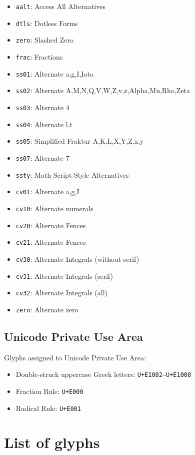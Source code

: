 \documentclass[a4paper]{scrartcl}
\newcommand*{\opt}[1]{\texttt{#1}}
\begin{document}
\begin{itemize}
  \item \opt{aalt}: Access All Alternatives
  \item \opt{dtls}: Dotless Forms
  \item \opt{zero}: Slashed Zero
  \item \opt{frac}: Fractions
  \item \opt{ss01}: Alternate a,g,I,Iota
  \item \opt{ss02}: Alternate A,M,N,Q,V,W,Z,v,z,Alpha,Mu,Rho,Zeta
  \item \opt{ss03}: Alternate 4
  \item \opt{ss04}: Alternate l,t
  \item \opt{ss05}: Simplified Fraktur A,K,L,X,Y,Z,x,y
  \item \opt{ss07}: Alternate 7
  \item \opt{ssty}: Math Script Style Alternatives
  \item \opt{cv01}: Alternate a,g,I
  \item \opt{cv10}: Alternate numerals
  \item \opt{cv20}: Alternate Fences
  \item \opt{cv21}: Alternate Fences
  \item \opt{cv30}: Alternate Integrals (without serif)
  \item \opt{cv31}: Alternate Integrals (serif)
  \item \opt{cv32}: Alternate Integrals (all)
  \item \opt{zero}: Alternate zero
\end{itemize}

\subsection{Unicode Private Use Area}

Glyphs assigned to Unicode Private Use Area:

\begin{itemize}
	\item Double-struck uppercase Greek letters: \opt{U+E1002–U+E1008}
	\item Fraction Rule: \opt{U+E000}
	\item Radical Rule: \opt{U+E001}
\end{itemize}

\pagebreak

\section{List of glyphs}
\end{document}
